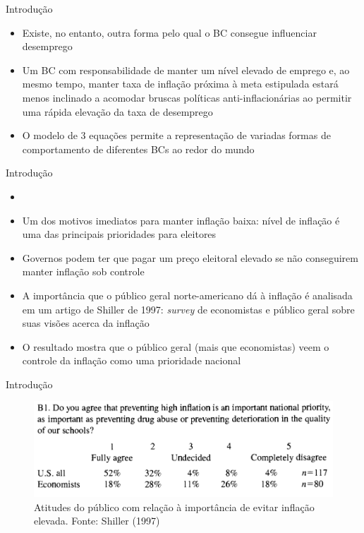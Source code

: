 \documentclass[10pt]{beamer}
\begin{document}
\begin{frame}
    {Introdução}
    \begin{itemize}
        \item Existe, no entanto, outra forma pelo qual o BC consegue influenciar desemprego\bigskip
        \item Um BC com responsabilidade de manter um nível elevado de emprego e, ao mesmo tempo, manter taxa de inflação próxima à meta estipulada estará menos inclinado a acomodar bruscas políticas anti-inflacionárias ao permitir uma rápida elevação da taxa de desemprego\bigskip
        \item O modelo de 3 equações permite a representação de variadas formas de comportamento de diferentes BCs ao redor do mundo
    \end{itemize}
\end{frame}

\begin{frame}
    {Introdução}
    \begin{itemize}
        \item {}\bigskip
        \item Um dos motivos imediatos para manter inflação baixa: nível de inflação é uma das principais prioridades para eleitores\bigskip
        \item Governos podem ter que pagar um preço eleitoral elevado se não conseguirem manter inflação sob controle\bigskip
        \item A importância que o público geral norte-americano dá à inflação é analisada em um artigo de Shiller de 1997: \emph{survey} de economistas e público geral sobre suas visões acerca da inflação\bigskip
        \item O resultado mostra que o público geral (mais que economistas) veem o controle da inflação como uma prioridade nacional
    \end{itemize}
\end{frame}

\begin{frame}
    {Introdução}
    \begin{figure}
        \includegraphics[width=\textwidth]{./figures/aula15_fig2.png}
        \caption{Atitudes do público com relação à importância de evitar inflação elevada. Fonte: Shiller (1997)}
    \end{figure}
\end{frame}
\end{document}
